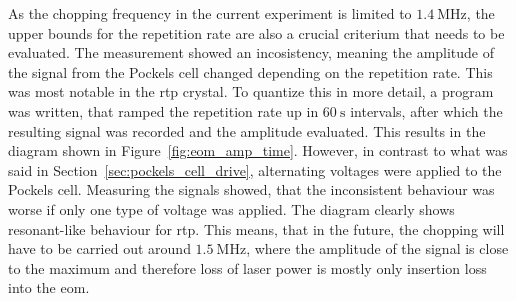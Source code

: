 \begin{figure}[t]%
\end{figure}

As the chopping frequency in the current experiment is limited to $\SI{1.4}{\mega\hertz}$, the upper bounds for the repetition rate are also a crucial criterium that needs to be evaluated. The measurement showed an incosistency, meaning the amplitude of the signal from the Pockels cell changed depending on the repetition rate. This was most notable in the \ac{rtp} crystal. To quantize this in more detail, a program was written, that ramped the repetition rate up in $\SI{60}{\second}$ intervals, after which the resulting signal was recorded and the amplitude evaluated. This results in the diagram shown in Figure~\ref{fig:eom_amp_time}. However, in contrast to what was said in Section~\ref{sec:pockels_cell_drive}, alternating voltages were applied to the Pockels cell. Measuring the signals showed, that the inconsistent behaviour was worse if only one type of voltage was applied. The diagram clearly shows resonant-like behaviour for \ac{rtp}. This means, that in the future, the chopping will have to be carried out around $\SI{1.5}{\mega\hertz}$, where the amplitude of the signal is close to the maximum and therefore loss of laser power is mostly only insertion loss into the \ac{eom}.

\begin{figure}[t]%
\end{figure}

